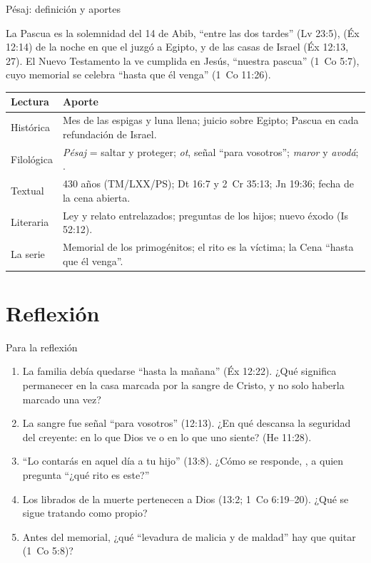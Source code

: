 \begin{frame}{Pésaj: definición y aportes}
\begin{tcolorbox}[colback=papiro,colframe=tierraroja,boxrule=1pt,arc=3pt,fontupper=\scriptsize]
La Pascua es la solemnidad del 14 de Abib, ``entre las dos tardes'' (Lv 23:5),  (Éx 12:14) de la noche en que el \SENOR{} juzgó a Egipto,  y  de las casas de Israel (Éx 12:13, 27). El Nuevo Testamento la ve cumplida en Jesús, ``nuestra pascua'' (1~Co 5:7), cuyo memorial se celebra ``hasta que él venga'' (1~Co 11:26).
\end{tcolorbox}
\scriptsize\renewcommand{\arraystretch}{1.08}
\begin{tabular}{@{}L{2.0cm}L{10.1cm}@{}}
\toprule
\textbf{Lectura} & \textbf{Aporte} \\ \midrule
Histórica & Mes de las espigas y luna llena; juicio sobre Egipto; Pascua en cada refundación de Israel. \\
Filológica & \emph{Pésaj} = saltar y proteger; \emph{ot}, señal ``para vosotros''; \emph{maror} y \emph{avodá}; . \\
Textual & 430 años (TM/LXX/PS); Dt 16:7 y 2~Cr 35:13; Jn 19:36; fecha de la cena abierta. \\
Literaria & Ley y relato entrelazados; preguntas de los hijos; nuevo éxodo (Is 52:12). \\
La serie & Memorial de los primogénitos; el rito es la víctima; la Cena ``hasta que él venga''. \\
\bottomrule
\end{tabular}
\end{frame}

\section{Reflexión}

\begin{frame}{Para la reflexión}
\small
\begin{enumerate}
\item La familia debía quedarse  ``hasta la mañana'' (Éx 12:22). ¿Qué significa permanecer en la casa marcada por la sangre de Cristo, y no solo haberla marcado una vez?
\item La sangre fue señal ``para vosotros'' (12:13). ¿En qué descansa la seguridad del creyente: en lo que Dios ve o en lo que uno siente? (He 11:28).
\item ``Lo contarás en aquel día a tu hijo'' (13:8). ¿Cómo se responde, , a quien pregunta ``¿qué rito es este?''
\item Los librados de la muerte pertenecen a Dios (13:2; 1~Co 6:19--20). ¿Qué se sigue tratando como propio?
\item Antes del memorial, ¿qué ``levadura de malicia y de maldad'' hay que quitar (1~Co 5:8)?
\end{enumerate}
\end{frame}

